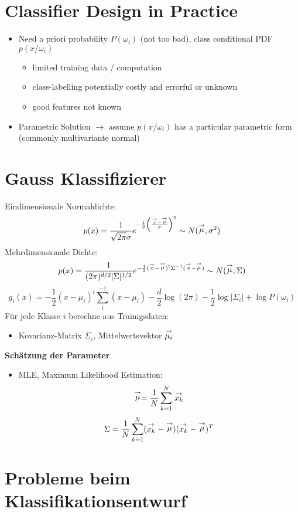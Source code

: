 \section{Classifier Design in Practice}
\begin{itemize}
	\item Need a priori probability $P(\omega_i)$ (not too bad), class conditional PDF $p(x/\omega_i)$
	\begin{itemize}
		\item limited training data / computation
		\item class-labelling potentially costly and errorful or unknown
		\item good features not known
	\end{itemize}
	\item Parametric Solution $\to$ assume $p(x/\omega_i)$ has a particular parametric form (commonly multivariante normal)
\end{itemize}

\section{Gauss Klassifizierer}

Eindimensionale Normaldichte: $$p(x) = \frac{1}{\sqrt{2\pi} \sigma} e^{- \frac{1}{2} \left( \frac{\stackrel{\to}{x} - \stackrel{\to}{\mu}}{\sigma} \right)^2} \sim N(\stackrel{\to}{\mu},\sigma^2)$$
Mehrdimensionale Dichte: $$p(x) = \frac{1}{(2\pi)^{d/2}|\Sigma|^{1/2}}e^{- \frac{1}{2} ( \stackrel{\to}{x} - \stackrel{\to}{\mu})^t \Sigma^{-1} (\stackrel{\to}{x} - \stackrel{\to}{\mu}) } \sim N(\stackrel{\to}{\mu},\Sigma)$$
$$g_i(x) = - \frac{1}{2} (x - \mu_i)^t \sum_i^{-1} (x - \mu_i) - \frac{d}{2} \log(2\pi) - \frac{1}{2} \log|\Sigma_i| + \log P(\omega_i)$$
Für jede Klasse $i$ berechne aus Trainigsdaten:
\begin{itemize}
\item Kovarianz-Matrix $\Sigma_i$, Mittelwertsvektor $\stackrel{\to}{\mu_i}$
\end{itemize}
\textbf{Schätzung der Parameter}
\begin{itemize}
\item MLE, Maximum Likelihood Estimation:
$$\stackrel{\to}{\mu} = \frac{1}{N} \sum\limits_{k=1}^N \stackrel{\to}{x_k}$$ $$\Sigma = \frac{1}{N} \sum\limits_{k=1}^N (\stackrel{\to}{x_k} - \stackrel{\to}{\mu})(\stackrel{\to}{x_k} - \stackrel{\to}{\mu})^T$$
\end{itemize}

\section{Probleme beim Klassifikationsentwurf}

